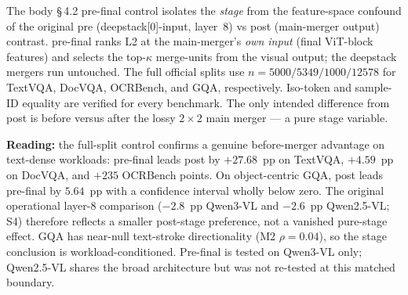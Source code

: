 \documentclass[journal]{IEEEtran}
\begin{document}
The body \S\,4.2 pre-final control isolates the \emph{stage} from the
feature-space confound of the original pre (deepstack[0]-input, layer~8) vs
post (main-merger output) contrast. pre-final ranks L2 at the main-merger's
\emph{own input} (final ViT-block features) and selects the top-$\kappa$
merge-units from the visual output; the deepstack mergers run untouched. The
full official splits use $n=5000/5349/1000/12578$ for TextVQA, DocVQA,
OCRBench, and GQA, respectively. Iso-token and sample-ID equality are verified
for every benchmark. The only intended difference from post is before versus
after the lossy $2\!\times\!2$ main merger --- a pure stage variable.

\begin{table}[ht]
  \centering
  \scriptsize
  \setlength{\tabcolsep}{2pt}
\end{table}

\noindent\textbf{Reading:} the full-split control confirms a genuine
before-merger advantage on text-dense workloads: pre-final leads post by
$+27.68$~pp on TextVQA, $+4.59$~pp on DocVQA, and $+235$ OCRBench points.
On object-centric GQA, post leads pre-final by $5.64$~pp with a confidence
interval wholly below zero. The original operational layer-8 comparison
($-2.8$~pp Qwen3-VL and $-2.6$~pp Qwen2.5-VL; S4) therefore reflects a smaller
post-stage preference, not a vanished pure-stage effect. GQA has near-null
text-stroke directionality (M2 $\rho = 0.04$), so the stage conclusion is
workload-conditioned. Pre-final is tested on Qwen3-VL only; Qwen2.5-VL shares
the broad architecture but was not re-tested at this matched boundary.
\end{document}
